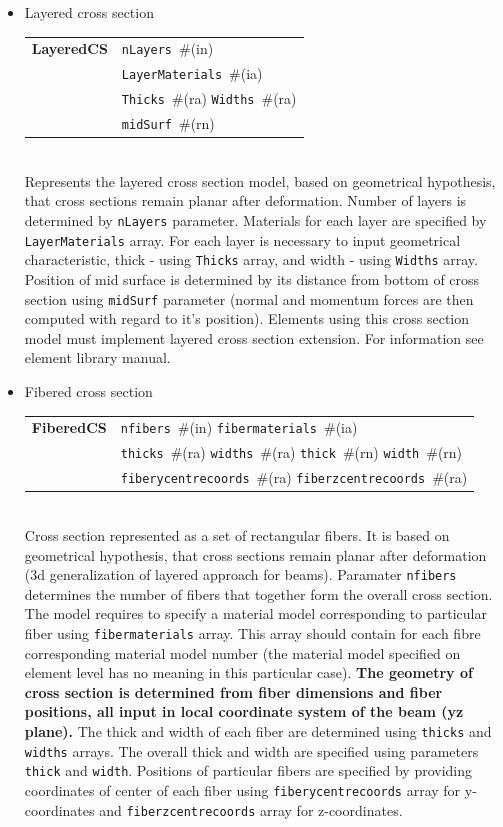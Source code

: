 \documentclass[a4paper]{article}
\makeatletter
\newcommand{\param}[1]{\texttt{#1}} %
\newcommand{\field}[2]{\param{#1}~\#{\tiny(#2)}} %
\newcommand{\entKeywordInst}[1]{\textbf{#1}} %
\newenvironment{record}[1][]{\begin{tabular}{|ll}}{\end{tabular}\\}
\newcommand{\recentry}[2]{{#1}&{#2}\\}
\newcounter{rcc}
\newenvironment{record}[1][\textwidth]{\setcounter{rcc}{0}\begin{tabular*}{#1}{|ll@{\extracolsep{\fill}}r}}{\end{tabular*}\\}
\newcommand{\recentry}[2]{\ifthenelse{\value{rcc}>0}{&$\backslash$ \\}{\setcounter{rcc}{1}}{#1}&{#2}}
\makeatother
\begin{document}
\begin{itemize}
\item
Layered cross section \\
\begin{record}[0.9\textwidth]
  \recentry{\entKeywordInst{LayeredCS}}{\field{nLayers}{in}}
  \recentry{}{\field{LayerMaterials}{ia}}
  \recentry{}{\field{Thicks}{ra} \field{Widths}{ra}}
  \recentry{}{\field{mid\-Surf}{rn}}
\end{record}
Represents the layered cross section model, based on
geometrical hypothesis, that cross sections remain planar after
deformation. Number of layers is
determined by \param{nLayers} parameter. Materials for each
layer are specified by \param{LayerMaterials} array. For each layer is
necessary to input
geometrical characteristic, thick - using \param{Thicks} array, and
width - using
\param{Widths} array. Position of mid surface is determined by its
distance from
bottom of cross section using \param{mid\-Surf} parameter (normal and
momentum forces are then computed with regard to it's position).
Elements using this cross section model must implement layered cross
section extension. For information see element library manual.
\item
Fibered cross section\\
\begin{record}[0.9\textwidth]
  \recentry{\entKeywordInst{FiberedCS}}{\field{nfibers}{in} \field{fibermaterials}{ia}}
  \recentry{}{\field{thicks}{ra} \field{widths}{ra} \field{thick}{rn} \field{width}{rn}}
  \recentry{}{\field{fiberycentrecoords}{ra} \field{fiberzcentrecoords}{ra}}
\end{record}
Cross section represented as a set of rectangular fibers. It is based on
geometrical hypothesis, that cross sections remain planar after
deformation (3d generalization of layered approach for beams).
Paramater \param{nfibers} determines the number of fibers that together form the overall cross section.
The model requires to specify a material model corresponding to particular fiber using \param{fibermaterials} array. This array should contain for each fibre corresponding material model number (the material model specified on element level has no meaning in this particular case).
\textbf{The geometry of cross section is determined from fiber dimensions and fiber positions, all input in local coordinate system of the beam (yz plane).} The thick and width of each fiber are determined using \param{thicks} and \param{widths} arrays. The overall thick and width are specified using parameters \param{thick} and \param{width}. Positions of particular fibers are specified by providing coordinates of center of each fiber using \param{fiberycentrecoords} array for y-coordinates and \param{fiberzcentrecoords} array for z-coordinates.
\end{itemize}
\end{document}

